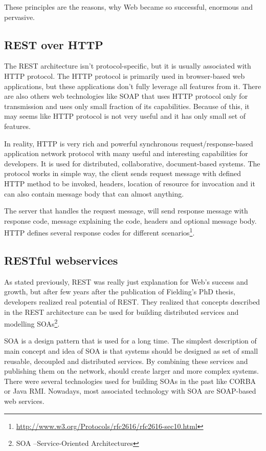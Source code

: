 \documentclass[12pt,final,oneside]{fithesis2}
\begin{document}
These principles are the reasons, why Web became so successful, enormous and pervasive.\cite{resteasy-book}

\subsection{REST over HTTP}
The REST architecture isn't protocol-specific, but it is usually associated with HTTP protocol. The HTTP protocol is primarily used in browser-based web applications, but these applications don't fully leverage all features from it. There are also others web technologies like SOAP that uses HTTP protocol only for transmission and uses only small fraction of its capabilities. Because of this, it may seems like HTTP protocol is not very useful and it has only small set of features. 

In reality, HTTP is very rich and powerful synchronous request/response-based application network protocol with many useful and interesting capabilities for developers. It is used for distributed, collaborative, document-based systems. The protocol works in simple way, the client sends request message with defined HTTP method to be invoked, headers, location of resource for invocation and it can also contain message body that can almost anything.

The server that handles the request message, will send response message with response code, message explaining the code, headers and optional message body. HTTP defines several response codes for different scenarios\footnote{\url{http://www.w3.org/Protocols/rfc2616/rfc2616-sec10.html}}.\cite{resteasy-book}

\subsection{RESTful webservices}
As stated previously, REST was really just explanation for Web's success and growth, but after few years after the publication of Fielding's PhD thesis, developers realized real potential of REST. They realized that concepts described in the REST architecture can be used for building distributed services and modelling SOAs\footnote{SOA --Service-Oriented Architectures}. 

SOA is a design pattern that is used for a long time. The simplest description of main concept and idea of SOA is that systems should be designed as set of small reusable, decoupled and distributed services. By combining these services and publishing them on the network, should create larger and more complex systems. There were several technologies used for building SOAs in the past like CORBA or Java RMI. Nowadays, most associated technology with SOA are SOAP-based web services.  
\end{document}
